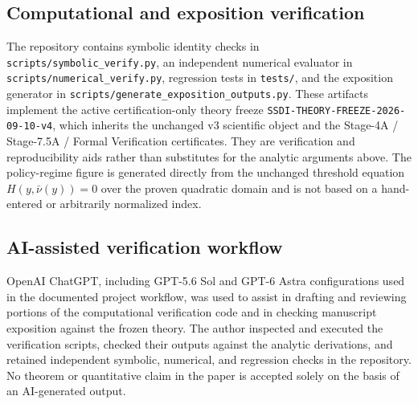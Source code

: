 \subsection{Computational and exposition verification}
The repository contains symbolic identity checks in \texttt{scripts/symbolic\_verify.py}, an independent numerical evaluator in \texttt{scripts/numerical\_verify.py}, regression tests in \texttt{tests/}, and the exposition generator in \texttt{scripts/generate\_exposition\_outputs.py}. These artifacts implement the active certification-only theory freeze \texttt{SSDI-THEORY-FREEZE-2026-09-10-v4}, which inherits the unchanged v3 scientific object and the Stage-4A / Stage-7.5A / Formal Verification certificates. They are verification and reproducibility aids rather than substitutes for the analytic arguments above. The policy-regime figure is generated directly from the unchanged threshold equation $H(y,\bar\nu(y))=0$ over the proven quadratic domain and is not based on a hand-entered or arbitrarily normalized index.

\subsection{AI-assisted verification workflow}
OpenAI ChatGPT, including GPT-5.6 Sol and GPT-6 Astra configurations used in the documented project workflow, was used to assist in drafting and reviewing portions of the computational verification code and in checking manuscript exposition against the frozen theory. The author inspected and executed the verification scripts, checked their outputs against the analytic derivations, and retained independent symbolic, numerical, and regression checks in the repository. No theorem or quantitative claim in the paper is accepted solely on the basis of an AI-generated output.
